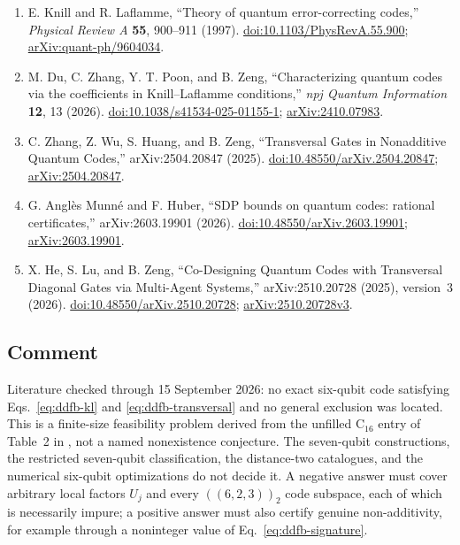 \begin{enumerate}[label={},leftmargin=4.8em,labelsep=0.5em]
  \footnotesize
  \item[\textup{[KL97]}]\label{ref:ddfb-kl}
  E. Knill and R. Laflamme, ``Theory of quantum error-correcting codes,'' \emph{Physical Review A} \textbf{55}, 900--911 (1997). \href{https://doi.org/10.1103/PhysRevA.55.900}{doi:10.1103/PhysRevA.55.900}; \href{https://arxiv.org/abs/quant-ph/9604034}{arXiv:quant-ph/9604034}.

  \item[\textup{[DZPZ26]}]\label{ref:ddfb-dzpz}
  M. Du, C. Zhang, Y. T. Poon, and B. Zeng, ``Characterizing quantum codes via the coefficients in Knill--Laflamme conditions,'' \emph{npj Quantum Information} \textbf{12}, 13 (2026). \href{https://doi.org/10.1038/s41534-025-01155-1}{doi:10.1038/s41534-025-01155-1}; \href{https://arxiv.org/abs/2410.07983}{arXiv:2410.07983}.

  \item[\textup{[ZWHZ25]}]\label{ref:ddfb-zwhz}
  C. Zhang, Z. Wu, S. Huang, and B. Zeng, ``Transversal Gates in Nonadditive Quantum Codes,'' arXiv:2504.20847 (2025). \href{https://doi.org/10.48550/arXiv.2504.20847}{doi:10.48550/arXiv.2504.20847}; \href{https://arxiv.org/abs/2504.20847}{arXiv:2504.20847}.

  \item[\textup{[AMH26]}]\label{ref:ddfb-amh}
  G. Angl\`es Munn\'e and F. Huber, ``SDP bounds on quantum codes: rational certificates,'' arXiv:2603.19901 (2026). \href{https://doi.org/10.48550/arXiv.2603.19901}{doi:10.48550/arXiv.2603.19901}; \href{https://arxiv.org/abs/2603.19901}{arXiv:2603.19901}.

  \item[\textup{[HLZ25]}]\label{ref:ddfb-hlz}
  X. He, S. Lu, and B. Zeng, ``Co-Designing Quantum Codes with Transversal Diagonal Gates via Multi-Agent Systems,'' arXiv:2510.20728 (2025), version~3 (2026). \href{https://doi.org/10.48550/arXiv.2510.20728}{doi:10.48550/arXiv.2510.20728}; \href{https://arxiv.org/abs/2510.20728v3}{arXiv:2510.20728v3}.
\end{enumerate}

\subsection*{Comment}

Literature checked through 15 September 2026: no exact six-qubit code
satisfying Eqs.~\eqref{eq:ddfb-kl} and \eqref{eq:ddfb-transversal} and no
general exclusion was located.  This is a finite-size feasibility problem
derived from the unfilled $\mathrm C_{16}$ entry of Table~2 in
, not a named nonexistence conjecture.  The
seven-qubit constructions, the restricted seven-qubit classification, the
distance-two catalogues, and the numerical six-qubit optimizations do not
decide it.  A negative answer must cover arbitrary local factors $U_j$ and every
$((6,2,3))_2$ code subspace, each of which is necessarily impure; a positive
answer must also certify genuine non-additivity, for example through a
noninteger value of Eq.~\eqref{eq:ddfb-signature}.

